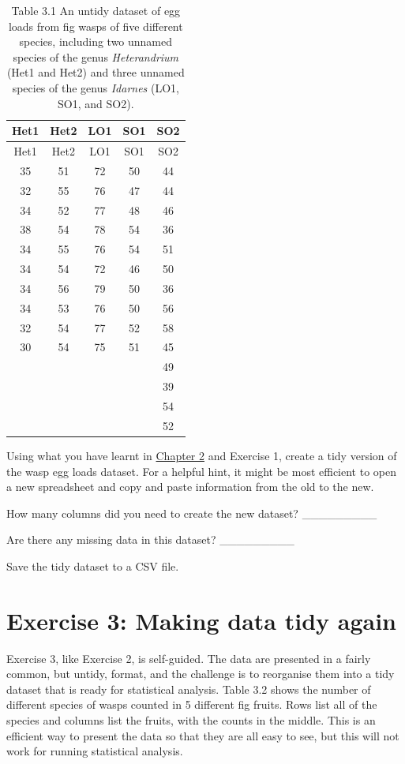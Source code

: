 \documentclass[
  openany]{scrbook}
\begin{document}
\begin{longtable}[]{@{}ccccc@{}}
\caption{Table 3.1 An untidy dataset of egg loads from fig wasps of five different species, including two unnamed species of the genus \emph{Heterandrium} (Het1 and Het2) and three unnamed species of the genus \emph{Idarnes} (LO1, SO1, and SO2).}\tabularnewline
\toprule
Het1 & Het2 & LO1 & SO1 & SO2 \\
\midrule
\endfirsthead
\toprule
Het1 & Het2 & LO1 & SO1 & SO2 \\
\midrule
\endhead
35 & 51 & 72 & 50 & 44 \\
32 & 55 & 76 & 47 & 44 \\
34 & 52 & 77 & 48 & 46 \\
38 & 54 & 78 & 54 & 36 \\
34 & 55 & 76 & 54 & 51 \\
34 & 54 & 72 & 46 & 50 \\
34 & 56 & 79 & 50 & 36 \\
34 & 53 & 76 & 50 & 56 \\
32 & 54 & 77 & 52 & 58 \\
30 & 54 & 75 & 51 & 45 \\
& & & & 49 \\
& & & & 39 \\
& & & & 54 \\
& & & & 52 \\
\bottomrule
\end{longtable}

Using what you have learnt in \protect\hyperlink{Chapter_2}{Chapter 2} and Exercise 1, create a tidy version of the wasp egg loads dataset.
For a helpful hint, it might be most efficient to open a new spreadsheet and copy and paste information from the old to the new.

How many columns did you need to create the new dataset? \_\_\_\_\_\_\_\_\_

Are there any missing data in this dataset? \_\_\_\_\_\_\_\_\_

Save the tidy dataset to a CSV file.

\hypertarget{exercise-3-making-data-tidy-again}{%
\section{Exercise 3: Making data tidy again}\label{exercise-3-making-data-tidy-again}}

Exercise 3, like Exercise 2, is self-guided.
The data are presented in a fairly common, but untidy, format, and the challenge is to reorganise them into a tidy dataset that is ready for statistical analysis.
Table 3.2 shows the number of different species of wasps counted in 5 different fig fruits.
Rows list all of the species and columns list the fruits, with the counts in the middle.
This is an efficient way to present the data so that they are all easy to see, but this will not work for running statistical analysis.
\end{document}
